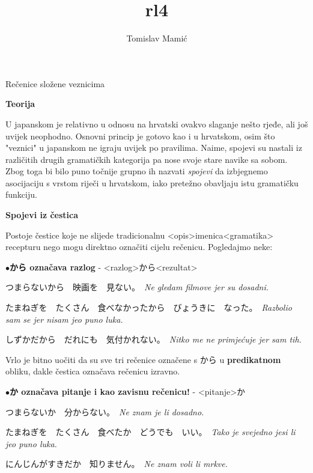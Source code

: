 \documentclass[12pt]{article}
\author{Tomislav Mamić}
\title{rl4}
\begin{document}
	
	\large Rečenice složene veznicima
	
	\vspace{20pt}
	\normalsize \textbf{Teorija}
	\vspace{20pt}
	
	U japanskom je relativno u odnosu na hrvatski ovakvo slaganje nešto rjeđe, ali još uvijek neophodno. Osnovni princip je gotovo kao i u hrvatskom, osim što "veznici" u japanskom ne igraju uvijek po pravilima. Naime, spojevi su nastali iz različitih drugih gramatičkih kategorija pa nose svoje stare navike sa sobom. Zbog toga bi bilo puno točnije grupno ih nazvati \textit{spojevi} da izbjegnemo asocijaciju s vrstom riječi u hrvatskom, iako pretežno obavljaju istu gramatičku funkciju.
	
	\vspace{20pt}
	\normalsize \textbf{Spojevi iz čestica}
	\vspace{20pt}
	
	Postoje čestice koje ne slijede tradicionalnu <opis>imenica<gramatika> recepturu nego mogu direktno označiti cijelu rečenicu. Pogledajmo neke:
	
	\vspace{5pt}
	\noindent
	$\bullet$\textbf{から označava razlog} - <razlog>から<rezultat>
	\vspace{5pt}
	
	つまらないから　映画を　見ない。　\textit{Ne gledam filmove jer su dosadni.}
	
	たまねぎを　たくさん　食べなかったから　びょうきに　なった。　\textit{Razbolio sam se jer nisam jeo puno luka.}
	
	しずかだから　だれにも　気付かれない。　\textit{Nitko me ne primjećuje jer sam tih.}
	
	\vspace{5pt}
	Vrlo je bitno uočiti da su sve tri rečenice označene s から u \textbf{predikatnom} obliku, dakle čestica označava rečenicu izravno.
	
	\vspace{5pt}
	\noindent
	$\bullet$\textbf{か označava pitanje i kao zavisnu rečenicu!} - <pitanje>か
	\vspace{5pt}
	
	つまらないか　分からない。　\textit{Ne znam je li dosadno.}
	
	たまねぎを　たくさん　食べたか　どうでも　いい。　\textit{Tako je svejedno jesi li jeo puno luka.}\footnotemark[1]
	
	にんじんがすきだか　知りません。　\textit{Ne znam voli li mrkve.}
	
\end{document}
